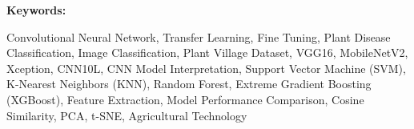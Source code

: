 \documentclass[12pt, oneside, a4paper]{book}
\begin{document}
    \large \textbf{Keywords:} \par \vspace{1em}
    \normalsize    Convolutional Neural Network, Transfer Learning, Fine Tuning, Plant Disease Classification, Image Classification, Plant Village Dataset, VGG16, MobileNetV2, Xception, CNN10L, CNN Model Interpretation, Support Vector Machine (SVM), K-Nearest Neighbors (KNN), Random Forest,  Extreme Gradient Boosting (XGBoost), Feature Extraction, Model Performance Comparison, Cosine Similarity, PCA, t-SNE, Agricultural Technology
\endgroup

\tableofcontents

\listoftables
\listoffigures 























% 

 




% 
\newpage
\end{document}
